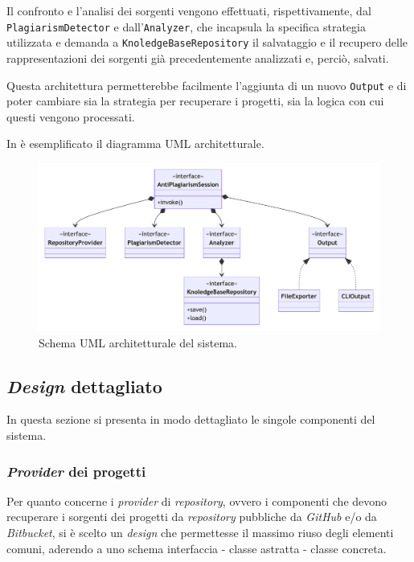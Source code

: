 Il confronto e l'analisi dei sorgenti vengono effettuati, rispettivamente, dal \texttt{PlagiarismDetector} e dall'\texttt{Analyzer}, che incapsula la specifica strategia utilizzata e demanda a \texttt{KnoledgeBaseRepository} il salvataggio e il recupero delle rappresentazioni dei sorgenti già precedentemente analizzati e, perciò, salvati.

Questa architettura permetterebbe facilmente l'aggiunta di un nuovo \texttt{Output} e di poter cambiare sia la strategia per recuperare i progetti, sia la logica con cui questi vengono processati.

In  è esemplificato il diagramma UML architetturale.

\begin{figure}[h!]
    \centering
    \includegraphics[width=\textwidth]{resources/img/02-achitecture.pdf}
    \caption{Schema UML architetturale del sistema.}
    \label{img:02-architecture}
\end{figure}

\subsection{\textit{Design} dettagliato}
In questa sezione si presenta in modo dettagliato le singole componenti del sistema.

\subsubsection*{\textit{Provider} dei progetti}
Per quanto concerne i \textit{provider} di \textit{repository}, ovvero i componenti che devono recuperare i sorgenti dei progetti da \textit{repository} pubbliche da \textit{GitHub} e/o da \textit{Bitbucket}, si è scelto un \textit{design} che permettesse il massimo riuso degli elementi comuni, aderendo a uno schema interfaccia - classe astratta - classe concreta.

